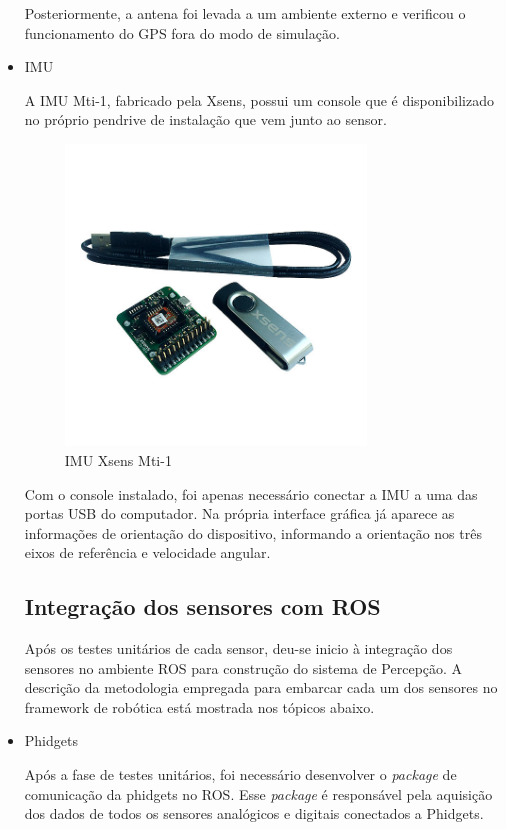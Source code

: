 \begin{itemize}
		Posteriormente, a antena foi levada a um ambiente externo e verificou o funcionamento do GPS fora do modo de simulação.    
		
		\item IMU
		
		A IMU Mti-1, fabricado pela Xsens, possui um console que é disponibilizado no próprio pendrive de instalação que vem junto ao sensor.
		
		\begin{figure}[!ht]
			\centering
			\includegraphics[width=8cm]{Figures/imu.jpg}
			\caption{IMU Xsens Mti-1}
			\label{fig:IMU}
		\end{figure}
		
		Com o console instalado, foi apenas necessário conectar a IMU a uma das portas USB do computador. Na própria interface gráfica já aparece as informações de orientação do dispositivo, informando a orientação nos três eixos de referência e velocidade angular.
		
		\subsection{Integração dos sensores com ROS}
		\label{sec:rosinte}
		
		Após os testes unitários de cada sensor, deu-se inicio à integração dos sensores no ambiente ROS para construção do sistema de Percepção. A descrição da metodologia empregada para embarcar cada um dos sensores no framework de robótica está mostrada nos tópicos abaixo.
		
		\item{Phidgets}
		
		Após a fase de testes unitários, foi necessário desenvolver o \textit{package} de comunicação da phidgets no ROS. Esse \textit{package} é responsável pela aquisição dos dados de todos os sensores analógicos e digitais conectados a Phidgets.
		

\end{itemize}
